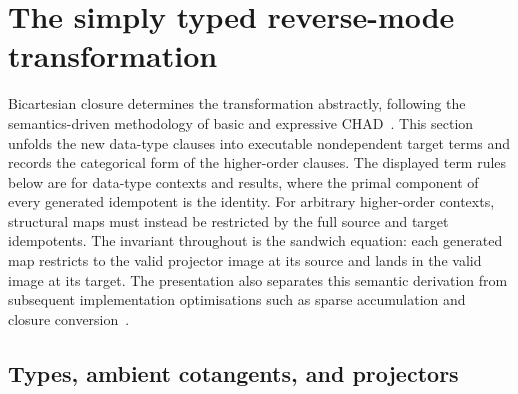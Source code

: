 \documentclass[runningheads,envcountsame]{llncs}
\begin{document}
\section{The simply typed reverse-mode transformation}
\label{app:macro}

Bicartesian closure determines the transformation abstractly, following the semantics-driven methodology of basic and expressive CHAD~\cite{Vakar2021,VakarSmeding2022,LucatelliNunesVakar2023}. This section unfolds the new data-type clauses into executable nondependent target terms and records the categorical form of the higher-order clauses. The displayed term rules below are for data-type contexts and results, where the primal component of every generated idempotent is the identity. For arbitrary higher-order contexts, structural maps must instead be restricted by the full source and target idempotents. The invariant throughout is the sandwich equation: each generated map restricts to the valid projector image at its source and lands in the valid image at its target. The presentation also separates this semantic derivation from subsequent implementation optimisations such as sparse accumulation and closure conversion~\cite{SmedingVakar2024}.

\subsection{Types, ambient cotangents, and projectors}
\end{document}
